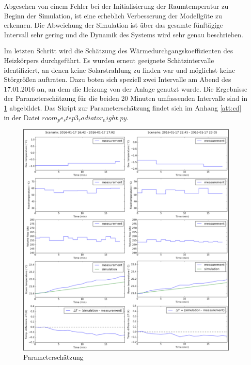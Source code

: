 Abgesehen von einem Fehler bei der Initialisierung der Raumtemperatur zu Beginn der Simulation, ist eine erheblich Verbesserung der Modellgüte zu erkennen. Die Abweichung der Simulation ist über das gesamte fünftägige Intervall sehr gering und die Dynamik des Systems wird sehr genau beschrieben.

Im letzten Schritt wird die Schätzung des Wärmedurchgangskoeffizienten des Heizkörpers durchgeführt. Es wurden erneut geeignete Schätzintervalle identifiziert, an denen keine Solarstrahlung zu finden war und möglichst keine Störgrößen auftraten. Dazu boten sich speziell zwei Intervalle am Abend des 17.01.2016 an, an dem die Heizung von der Anlage genutzt wurde. Die Ergebnisse der Parameterschätzung für die beiden 20 Minuten umfassenden Intervalle sind in \ref{fig:step3} abgebildet. Das Skript zur Parameterschätzung findet sich im Anhang \ref{att:cd} in der Datei $room_pe_step3_radiator_night.py$.

\begin{figure}
\centering
\includegraphics[width=\textwidth]{abbildungen/20160329_pestep3}
\caption{Parameterschätzung}
\label{fig:step3}
\end{figure}

